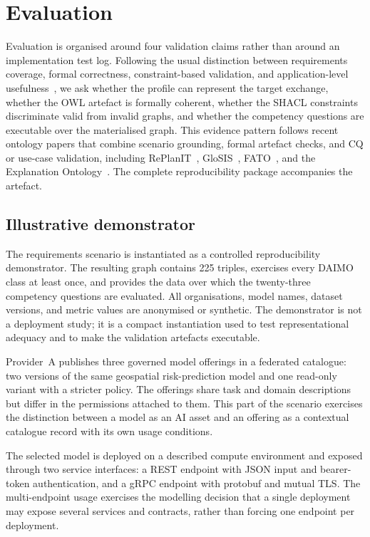 \documentclass[Afour,sagev,times]{sagej}
\begin{document}
\section{Evaluation}\label{sec:eval}

Evaluation is organised around four validation claims rather than around an implementation test log. Following the usual distinction between requirements coverage, formal correctness, constraint-based validation, and application-level usefulness~\cite{brank05}, we ask whether the profile can represent the target exchange, whether the OWL artefact is formally coherent, whether the SHACL constraints discriminate valid from invalid graphs, and whether the competency questions are executable over the materialised graph. This evidence pattern follows recent ontology papers that combine scenario grounding, formal artefact checks, and CQ or use-case validation, including RePlanIT~\cite{kurteva}, GloSIS~\cite{palma}, FATO~\cite{fato}, and the Explanation Ontology~\cite{explanation-ontology}. The complete reproducibility package accompanies the artefact.

\subsection{Illustrative demonstrator}\label{sec:eval-usecase}

The requirements scenario is instantiated as a controlled reproducibility demonstrator. The resulting graph contains 225 triples, exercises every DAIMO class at least once, and provides the data over which the twenty-three competency questions are evaluated. All organisations, model names, dataset versions, and metric values are anonymised or synthetic. The demonstrator is not a deployment study; it is a compact instantiation used to test representational adequacy and to make the validation artefacts executable.

Provider~A publishes three governed model offerings in a federated catalogue: two versions of the same geospatial risk-prediction model and one read-only variant with a stricter policy. The offerings share task and domain descriptions but differ in the permissions attached to them. This part of the scenario exercises the distinction between a model as an AI asset and an offering as a contextual catalogue record with its own usage conditions.

The selected model is deployed on a described compute environment and exposed through two service interfaces: a REST endpoint with JSON input and bearer-token authentication, and a gRPC endpoint with protobuf and mutual TLS. The multi-endpoint usage exercises the modelling decision that a single deployment may expose several services and contracts, rather than forcing one endpoint per deployment.
\end{document}
